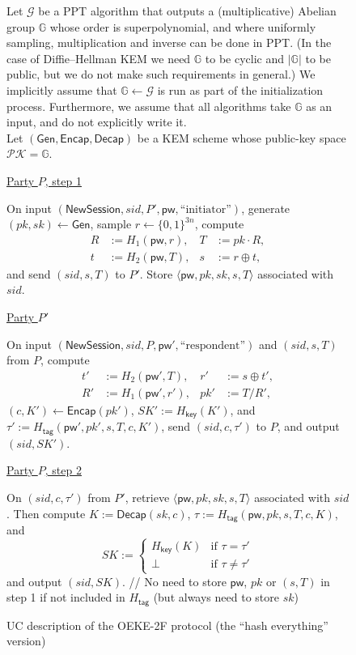 \documentclass{article}
\theoremstyle{plain}
\theoremstyle{definition}
\theoremstyle{remark}
\newcommand{\group}{\mathbb{G}}
\newcommand{\pkspace}{\mathcal{PK}}
\newcommand{\Gen}{\mathsf{Gen}}
\newcommand{\Encap}{\mathsf{Encap}}
\newcommand{\Decap}{\mathsf{Decap}}
\newcommand{\Hkey}{H_\mathsf{key}}
\newcommand{\Htag}{H_\mathsf{tag}}
\newcommand{\pw}{\mathsf{pw}}
\newcommand{\NewSession}{\mathsf{NewSession}}
\begin{document}
\begin{figure}[H]
\begin{framed}
\begin{small}
Let $\mathcal{G}$ be a PPT algorithm that outputs a (multiplicative) Abelian group $\group$ whose order is superpolynomial, and where uniformly sampling, multiplication and inverse can be done in PPT. (In the case of Diffie--Hellman KEM we need $\group$ to be cyclic and $|\group|$ to be public, but we do not make such requirements in general.) We implicitly assume that $\group \gets \mathcal{G}$ is run as part of the initialization process. Furthermore, we assume that all algorithms take $\group$ as an input, and do not explicitly write it. \\
Let $(\Gen,\Encap,\Decap)$ be a KEM scheme whose public-key space $\pkspace = \group$.

\medskip
\underline{Party $P$, step 1}

\medskip
On input $(\NewSession, sid, P', \pw, \text{``initiator''})$, generate $(pk,sk) \gets \Gen$, sample $r \gets \{0,1\}^{3n}$, compute
\begin{align*}
R &:= H_1(\pw,r), &T &:= pk \cdot R, \\
t &:= H_2(\pw,T), &s &:= r \oplus t,
\end{align*}
and send $(sid,s,T)$ to $P'$. Store $\langle\pw,pk,sk,s,T\rangle$ associated with $sid$.

\medskip
\underline{Party $P'$}

\medskip
On input $(\NewSession, sid, P, \pw', \text{``respondent''})$ and $(sid,s,T)$ from $P$, compute
\begin{align*}
t' &:= H_2(\pw',T), &r' &:= s \oplus t', \\
R' &:= H_1(\pw',r'), &pk' &:= T/R',
\end{align*}
$(c,K') \gets \Encap(pk')$, $SK' := \Hkey(K')$, and $\tau' := \Htag(\pw',pk',s,T,c,K')$, send $(sid,c,\tau')$ to $P$, and output $(sid,SK')$.

\medskip
\underline{Party $P$, step 2}

\medskip
On $(sid,c,\tau')$ from $P'$, retrieve $\langle\pw,pk,sk,s,T\rangle$ associated with $sid$. Then compute $K := \Decap(sk,c)$, $\tau := \Htag(\pw,pk,s,T,c,K)$, and
\[
SK :=
\begin{cases}
\Hkey(K) & \text{if }\tau = \tau' \\
\bot & \text{if }\tau \neq \tau'
\end{cases}
\]
and output $(sid,SK)$. \quad \textcolor[gray]{0.5}{// No need to store $\pw$, $pk$ or $(s,T)$ in step 1 if not included in $\Htag$ (but always need to store $sk$)}
\end{small}
\end{framed}
\caption{UC description of the OEKE-2F protocol (the ``hash everything'' version)}
\label{fig:protocol-uc}
\end{figure}
\end{document}
